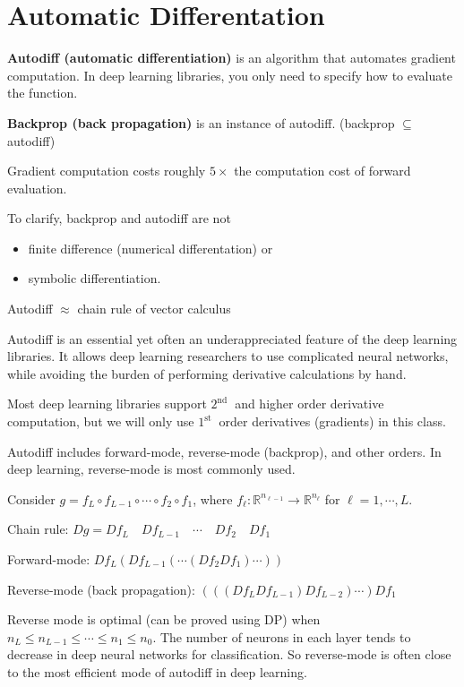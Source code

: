 \documentclass{report}
\begin{document}
\section{Automatic Differentation}

\begin{definition}
    \textbf{Autodiff (automatic differentiation)} is an algorithm that automates gradient computation. In deep learning libraries, you only need to specify how to evaluate the function.

    \textbf{Backprop (back propagation)} is an instance of autodiff. (backprop $\subseteq$ autodiff)

    Gradient computation costs roughly $5 \times$ the computation cost of forward evaluation.

    To clarify, backprop and autodiff are not

    \begin{itemize}
        \item finite difference (numerical differentation) or
        \item symbolic differentiation.
    \end{itemize}

    Autodiff $\approx$ chain rule of vector calculus

    \par\noindent\textcolor{gray}{\hdashrule{\textwidth}{0.4pt}{1pt 2pt}}

    Autodiff is an essential yet often an underappreciated feature of the deep learning libraries. It allows deep learning researchers to use complicated neural networks, while avoiding the burden of performing derivative calculations by hand.

    Most deep learning libraries support $2^{\text {nd }}$ and higher order derivative computation, but we will only use $1^{\text {st }}$ order derivatives (gradients) in this class.

    Autodiff includes forward-mode, reverse-mode (backprop), and other orders. In deep learning, reverse-mode is most commonly used.
\end{definition}

\begin{concept}
    Consider $g=f_{L} \circ f_{L-1} \circ \cdots \circ f_{2} \circ f_{1}$, where $f_{\ell}: \mathbb{R}^{n_{\ell-1}} \rightarrow \mathbb{R}^{n_{\ell}}$ for $\ell=1, \cdots, L$.

    Chain rule: $D g=D f_{L} \quad D f_{L-1} \quad \cdots \quad D f_{2} \quad D f_{1}$

    Forward-mode: $D f_{L}\left(D f_{L-1}\left(\cdots\left(D f_{2} D f_{1}\right) \cdots\right)\right)$

    Reverse-mode (back propagation): $\left(\left(\left(D f_{L} D f_{L-1}\right) D f_{L-2}\right) \cdots\right) D f_{1}$

    Reverse mode is optimal (can be proved using DP) when $n_{L} \leq n_{L-1} \leq \cdots \leq n_{1} \leq n_{0}$. The number of neurons in each layer tends to decrease in deep neural networks for classification. So reverse-mode is often close to the most efficient mode of autodiff in deep learning.
\end{concept}
\end{document}
